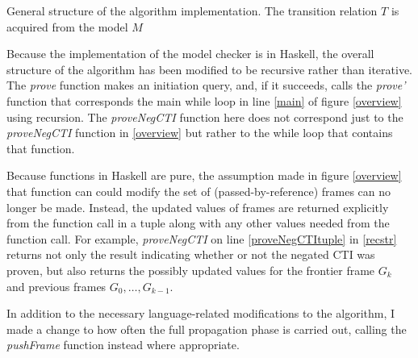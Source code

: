 \documentclass[12pt,a4paper,twoside,openright]{report}
\begin{document}
{
\begin{algorithm}[!Ht]
\DontPrintSemicolon
{}
\caption{General structure of the algorithm implementation. The transition relation $T$ is acquired
from the model $M$}
\label{recstr}
\end{algorithm}

Because the implementation of the model checker is in Haskell, the overall
structure of the algorithm has been modified to be recursive rather than iterative.
The {\it prove} function makes an initiation query, and, if it succeeds, calls the
{\it prove'} function that corresponds the main while loop in line \ref{main} of figure
\ref{overview} using recursion. The {\it proveNegCTI} function here
does not correspond just to the {\it proveNegCTI} function in \ref{overview} but rather
to the while loop that contains that function.

Because functions in Haskell are pure, the assumption made in figure \ref{overview}
that function can could modify the set of (passed-by-reference) frames can no longer be made.
Instead, the updated values of frames are returned explicitly from the function call in
a tuple along with any other values needed from the function call. For example,
{\it proveNegCTI} on line \ref{proveNegCTItuple} in \ref{recstr} returns not only the result
indicating whether or not the negated CTI was proven, but also returns the possibly updated
values for the frontier frame $G_k$ and previous frames $G_0, \ldots, G_{k - 1}$.

In addition to the necessary language-related modifications to the algorithm, I made a
change to how often the full propagation phase is carried out, calling the {\it pushFrame}
function instead where appropriate.

}
\end{document}
